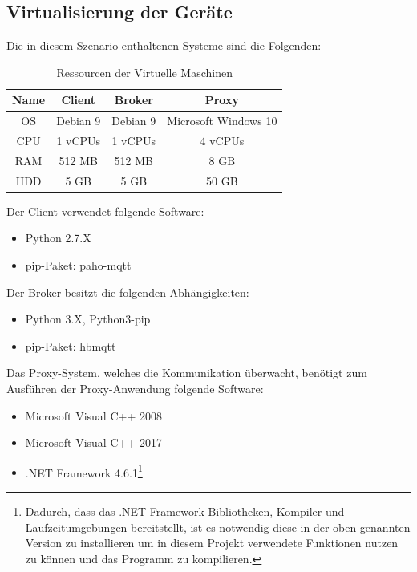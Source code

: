     \subsection{Virtualisierung der Geräte}
    Die in diesem Szenario enthaltenen Systeme sind die Folgenden:
    \begin{table}[h]
        \centering
        \begin{tabular}{c|c|c|c}
            Name & Client & Broker & Proxy \\ \hline
            OS & Debian 9 & Debian 9 & Microsoft Windows 10 \\
            CPU & 1 vCPUs & 1 vCPUs & 4 vCPUs \\
            RAM & 512 \ac{MB} & 512 \ac{MB} & 8 GB \\
            HDD & 5 GB & 5 GB & 50 GB \\
        \end{tabular}
        \caption{Ressourcen der Virtuelle Maschinen}
        \label{tab:ressourcenverteilung}
    \end{table}
    
    Der Client verwendet folgende Software:
    \begin{itemize}
        \item Python 2.7.X
        \item pip-Paket: paho-mqtt
    \end{itemize}
            
    Der Broker besitzt die folgenden Abhängigkeiten:
    \begin{itemize}
        \item Python 3.X, Python3-pip
        \item pip-Paket: hbmqtt
    \end{itemize}
            
    Das Proxy-System, welches die Kommunikation überwacht, benötigt zum Ausführen der Proxy-Anwendung folgende Software:
    \begin{itemize}
        \item Microsoft Visual C++ 2008
        \item Microsoft Visual C++ 2017
        \item .NET Framework 4.6.1\footnote{Dadurch, dass das .NET Framework Bibliotheken, Kompiler und Laufzeitumgebungen bereitstellt, ist es notwendig diese in der oben genannten Version zu installieren um in diesem Projekt verwendete Funktionen nutzen zu können und das Programm zu kompilieren.}
    \end{itemize}
    
